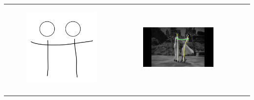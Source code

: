 \begin{table}[!htb]
\begin{tabular}{cccc}
\begin{subfigure}{0.2\textwidth}\centering\includegraphics[scale=0.1]{img/04keyframe}\end{subfigure}&
\begin{subfigure}{0.23\textwidth}\centering\includegraphics[scale=0.08]{img/keyframe_case_4_(3)}\end{subfigure}\\
\quad

\end{tabular}
\end{table}

